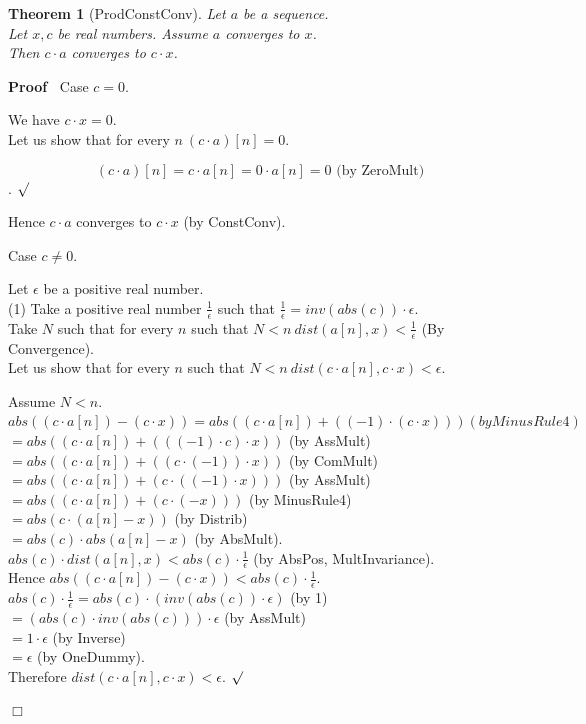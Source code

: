 \documentclass{article}
\newenvironment{forthel}{\begin{leftbar}}{\end{leftbar}}
\newenvironment{proof}{\noindent\textbf{Proof\ }}{\hspace*{\fill}$\Box$\medskip}
\newenvironment{subproof}{\begin{list}{}{}
		\item[\text{Proof}]}{\hfill $\surd$ \end{list}}
\newenvironment{case}{\begin{list}{}{}
		\item[]}{\end{list}}
\newtheorem{theorem}{Theorem}
\newcommand{\cdottwo}{\cdot}
\newcommand{\inveps}{\frac{1}{\epsilon}}
\newcommand{\dotequal}{=}
\begin{document}
\begin{forthel}
	\begin{theorem}[ProdConstConv]
	Let $a$ be a sequence. \\Let $x,c$ be real numbers. Assume $a$ converges to $x$.
	\\Then $c \cdottwo a$ converges to $c \cdot x$.
	\end{theorem}
	\begin{proof}
	Case $c = 0$.
	\begin{case}
	We have $c \cdot x = 0$.
	\\Let us show that for every $n \ (c \cdottwo a)[n] = 0$. 
	\begin{subproof}
	$$(c \cdottwo a)[n] \dotequal c \cdot a[n]
	\dotequal 0 \cdot a[n]
	\dotequal 0 \text{ (by ZeroMult)}$$.
	\end{subproof}
	Hence $c \cdottwo a$ converges to $c \cdot x$ (by ConstConv).
	\end{case}
	Case $c \neq 0$.
	\begin{case}
	Let $\epsilon$ be a positive real number. 
	\\(1)     Take a positive real number $\inveps$ such that $\inveps = inv(abs(c)) \cdot \epsilon$.
	\\Take $N$ such that for every $n$ such that $N < n \ dist(a[n],x) < \inveps$ (By Convergence).
	\\Let us show that for every $n$ such that $N < n \ dist(c \cdot a[n],c \cdot x) < \epsilon$.
	\begin{subproof}
	Assume $N < n$.
	\\$abs((c \cdot a[n]) - (c \cdot x)) \dotequal abs((c \cdot a[n]) +  ((-1) \cdot (c \cdot x))) (by MinusRule4)$ 
	\\$\dotequal abs((c \cdot a[n]) + (((-1) \cdot c) \cdot x))$ (by AssMult)
	\\$\dotequal abs((c \cdot a[n]) + ((c \cdot (-1)) \cdot x))$ (by ComMult)
	\\$\dotequal abs((c \cdot a[n]) + (c \cdot ((-1) \cdot x)))$ (by AssMult)
	\\$\dotequal abs((c \cdot a[n]) + (c \cdot (-x)))$ (by MinusRule4)
	\\$\dotequal abs(c \cdot (a[n] - x))$ (by Distrib)
	\\$\dotequal abs(c) \cdot abs(a[n] - x)$ (by AbsMult).
	\\$abs(c) \cdot dist(a[n],x) < abs(c) \cdot \inveps$ (by AbsPos, MultInvariance).
	\\Hence $abs((c \cdot a[n]) - (c \cdot x)) < abs(c) \cdot \inveps$.
	\\$abs(c) \cdot \inveps \dotequal abs(c) \cdot (inv(abs(c)) \cdot \epsilon)$ (by 1)
	\\$\dotequal (abs(c) \cdot inv(abs(c))) \cdot \epsilon$ (by AssMult)
	\\$\dotequal 1 \cdot \epsilon$ (by Inverse)
	\\$\dotequal \epsilon$ (by OneDummy).
	\\Therefore $dist(c \cdot a[n],c \cdot x) < \epsilon$.
	\end{subproof}
	\end{case}
	\end{proof}


\end{forthel}
\end{document}
